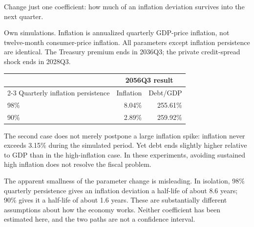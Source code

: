 \documentclass[11pt,letterpaper]{article}
\begin{document}
Change just one coefficient: how much of an inflation deviation survives into
the next quarter.

\begin{center}
\begin{minipage}{0.94\linewidth}
{\footnotesize Own simulations. Inflation is annualized quarterly GDP-price
inflation, not twelve-month consumer-price inflation. All parameters except
inflation persistence are identical. The Treasury premium ends in 2036Q3;
the private credit-spread shock ends in 2028Q3.}
\end{minipage}
\end{center}

\begin{center}
\begin{tabular}{lrr}
\toprule
 & \multicolumn{2}{c}{2056Q3 result}\\
\cmidrule(lr){2-3}
Quarterly inflation persistence & Inflation & Debt/GDP\\
\midrule
98\% & 8.04\% & 255.61\%\\
90\% & 2.89\% & 259.92\%\\
\bottomrule
\end{tabular}
\end{center}

The second case does not merely postpone a large inflation spike: inflation
never exceeds 3.15\% during the simulated period. Yet debt ends slightly
higher relative to GDP than in the high-inflation case. In these experiments,
avoiding sustained high inflation does not resolve the fiscal problem.

The apparent smallness of the parameter change is misleading. In isolation,
98\% quarterly persistence gives an inflation deviation a half-life of about
8.6 years; 90\% gives it a half-life of about 1.6 years. These are substantially
different assumptions about how the economy works. Neither coefficient has
been estimated here, and the two paths are not a confidence interval.
\end{document}
